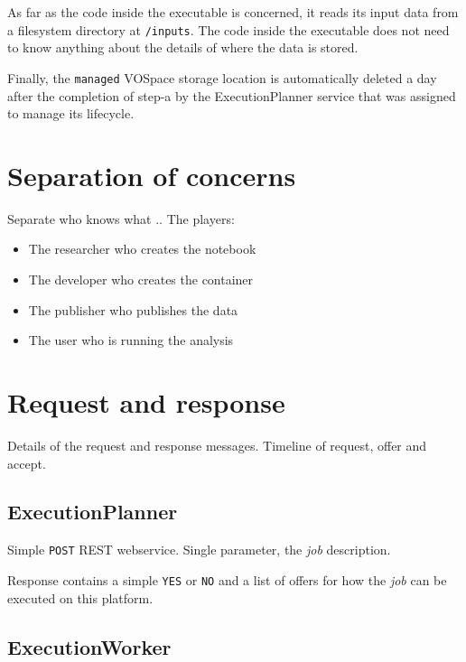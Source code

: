 \documentclass[11pt,a4paper]{ivoa}
\newcommand{\vospace} {VOSpace}
\newcommand{\execplanner} {ExecutionPlanner}
\newcommand{\codeword}[1] {\texttt{#1}}
\newcommand{\job} {\textit{job}}
\begin{document}
As far as the code inside the executable is concerned, it reads
its input data from a filesystem directory at \codeword{/inputs}.
The code inside the executable does not need to know anything about the
details of where the data is stored.

Finally, the \codeword{managed} \vospace{} storage location is automatically
deleted a day after the completion of step-a by the \execplanner{} service
that was assigned to manage its lifecycle.

\section{Separation of concerns}
\label{separate-concerns}

Separate who knows what ..
The players:
\begin{itemize}
    \item The researcher who creates the notebook
    \item The developer who creates the container
    \item The publisher who publishes the data
    \item The user who is running the analysis
\end{itemize}

\pagebreak

\section{Request and response}
\label{request-response}

Details of the request and response messages.
Timeline of request, offer and accept.

\subsection{ExecutionPlanner}
\label{execution-planner}

Simple \codeword{POST} REST webservice.
Single parameter, the \job{} description.

Response contains a simple \codeword{YES} or \codeword{NO}
and a list of offers for how the \job{} can be executed on this platform.



\subsection{ExecutionWorker}
\label{execution-worker}
\end{document}
